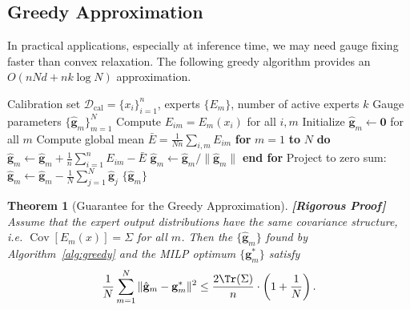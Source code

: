 \documentclass[12pt,a4paper]{article}
\newtheorem{theorem}{Theorem}[section]
\theoremstyle{remark}
\newcommand{\D}{\mathcal{D}}
\DeclareMathOperator{\Cov}{Cov}
\newcommand{\rigorFull}{\textnormal{\textbf{[Rigorous Proof]}}}
\begin{document}
\subsection{Greedy Approximation}

In practical applications, especially at inference time, we may need gauge fixing faster than convex relaxation. The following greedy algorithm provides an $O(n N d + n k \log N)$ approximation.

\begin{algorithm}[H]
\caption{Greedy Gauge Fixing}
\label{alg:greedy}
\begin{algorithmic}[1]
\Require Calibration set $\D_{\text{cal}} = \{x_i\}_{i=1}^{n}$, experts $\{E_m\}$, number of active experts $k$
\Ensure Gauge parameters $\{\hat{\mathbf{g}}_m\}_{m=1}^{N}$
\State Compute $E_{im} = E_m(x_i)$ for all $i, m$
\State Initialize $\hat{\mathbf{g}}_m \leftarrow \mathbf{0}$ for all $m$
\State Compute global mean $\bar{E} = \frac{1}{Nn} \sum_{i,m} E_{im}$ 
\State \textbf{for} $m = 1$ \textbf{to} $N$ \textbf{do}
\State \quad $\hat{\mathbf{g}}_m \leftarrow \hat{\mathbf{g}}_m + \frac{1}{n}\sum_{i=1}^{n} E_{im} - \bar{E}$ 
\State \quad $\hat{\mathbf{g}}_m \leftarrow \hat{\mathbf{g}}_m / \|\hat{\mathbf{g}}_m\|$ 
\State \textbf{end for}
\State Project to zero sum: $\hat{\mathbf{g}}_m \leftarrow \hat{\mathbf{g}}_m - \frac{1}{N}\sum_{j=1}^{N} \hat{\mathbf{g}}_j$
\State \Return $\{\hat{\mathbf{g}}_m\}$
\end{algorithmic}
\end{algorithm}

\begin{theorem}[Guarantee for the Greedy Approximation]\label{thm:greedy_bound}\rigorFull
Assume that the expert output distributions have the same covariance structure, i.e. $\Cov[E_m(x)] = \Sigma$ for all $m$. Then the $\{\hat{\mathbf{g}}_m\}$ found by Algorithm~\ref{alg:greedy} and the MILP optimum $\{\mathbf{g}_m^*\}$ satisfy
\begin{equation}
    \frac{1}{N}\sum_{m=1}^{N} \|\hat{\mathbf{g}}_m - \mathbf{g}_m^*\|^2 \leq \frac{2 \Tr(\Sigma)}{n} \cdot \left(1 + \frac{1}{N}\right).
\end{equation}
\end{theorem}
\end{document}
